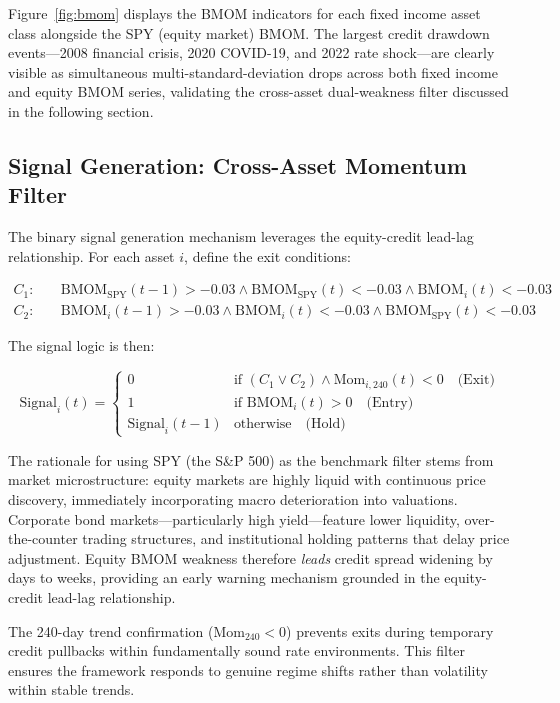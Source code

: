 \documentclass[11pt]{article}
\begin{document}
Figure~\ref{fig:bmom} displays the BMOM indicators for each fixed income asset class alongside the SPY (equity market) BMOM. The largest credit drawdown events---2008 financial crisis, 2020 COVID-19, and 2022 rate shock---are clearly visible as simultaneous multi-standard-deviation drops across both fixed income and equity BMOM series, validating the cross-asset dual-weakness filter discussed in the following section.

\subsection{Signal Generation: Cross-Asset Momentum Filter}

The binary signal generation mechanism leverages the equity-credit lead-lag relationship. For each asset $i$, define the exit conditions:

\begin{align}
C_1: \quad & \text{BMOM}_{\text{SPY}}(t-1) > -0.03 \wedge \text{BMOM}_{\text{SPY}}(t) < -0.03 \wedge \text{BMOM}_i(t) < -0.03 \\
C_2: \quad & \text{BMOM}_i(t-1) > -0.03 \wedge \text{BMOM}_i(t) < -0.03 \wedge \text{BMOM}_{\text{SPY}}(t) < -0.03
\end{align}

The signal logic is then:

\begin{equation}
\text{Signal}_i(t) = \begin{cases}
0 & \text{if } (C_1 \vee C_2) \wedge \text{Mom}_{i,240}(t) < 0 \quad \text{(Exit)} \\
1 & \text{if } \text{BMOM}_i(t) > 0 \quad \text{(Entry)} \\
\text{Signal}_i(t-1) & \text{otherwise} \quad \text{(Hold)}
\end{cases}
\end{equation}

The rationale for using SPY (the S\&P 500) as the benchmark filter stems from market microstructure: equity markets are highly liquid with continuous price discovery, immediately incorporating macro deterioration into valuations. Corporate bond markets---particularly high yield---feature lower liquidity, over-the-counter trading structures, and institutional holding patterns that delay price adjustment. Equity BMOM weakness therefore \textit{leads} credit spread widening by days to weeks, providing an early warning mechanism grounded in the equity-credit lead-lag relationship.

The 240-day trend confirmation ($\text{Mom}_{240} < 0$) prevents exits during temporary credit pullbacks within fundamentally sound rate environments. This filter ensures the framework responds to genuine regime shifts rather than volatility within stable trends.
\end{document}
